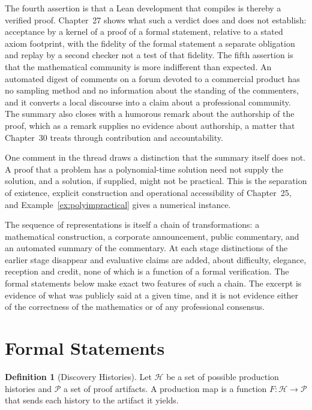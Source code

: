 \documentclass[11pt,letterpaper]{report}
\theoremstyle{plain}
\theoremstyle{definition}
\newtheorem{definition}[theorem]{Definition}
\theoremstyle{remark}
\begin{document}
The fourth assertion is that a Lean development that compiles is thereby a verified proof. Chapter~27 shows what such a verdict does and does not establish: acceptance by a kernel of a proof of a formal statement, relative to a stated axiom footprint, with the fidelity of the formal statement a separate obligation and replay by a second checker not a test of that fidelity. The fifth assertion is that the mathematical community is more indifferent than expected. An automated digest of comments on a forum devoted to a commercial product has no sampling method and no information about the standing of the commenters, and it converts a local discourse into a claim about a professional community. The summary also closes with a humorous remark about the authorship of the proof, which as a remark supplies no evidence about authorship, a matter that Chapter~30 treats through contribution and accountability.

One comment in the thread draws a distinction that the summary itself does not. A proof that a problem has a polynomial-time solution need not supply the solution, and a solution, if supplied, might not be practical. This is the separation of existence, explicit construction and operational accessibility of Chapter~25, and Example~\ref{ex:polyimpractical} gives a numerical instance.

The sequence of representations is itself a chain of transformations: a mathematical construction, a corporate announcement, public commentary, and an automated summary of the commentary. At each stage distinctions of the earlier stage disappear and evaluative claims are added, about difficulty, elegance, reception and credit, none of which is a function of a formal verification. The formal statements below make exact two features of such a chain. The excerpt is evidence of what was publicly said at a given time, and it is not evidence either of the correctness of the mathematics or of any professional consensus.

\section{Formal Statements}

\begin{definition}[Discovery Histories]\label{def:histories}
Let $\mathcal H$ be a set of possible production histories and $\mathcal P$ a set of proof artifacts. A production map is a function $F:\mathcal H\to\mathcal P$ that sends each history to the artifact it yields.
\end{definition}
\end{document}
